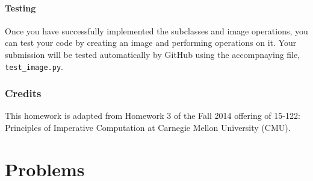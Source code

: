 \documentclass[addpoints]{exam}
\begin{document}
\subsection{Testing}

Once you have successfully implemented the subclasses and image operations, you can test your code by creating an image and performing operations on it. Your submission will be tested automatically by GitHub using the accompnaying  file, \texttt{test\_image.py}.


\section{Credits}

This homework is adapted from Homework 3 of the Fall 2014 offering of 15-122: Principles of Imperative Computation at Carnegie Mellon University (CMU).


\part{Problems}
\end{document}
